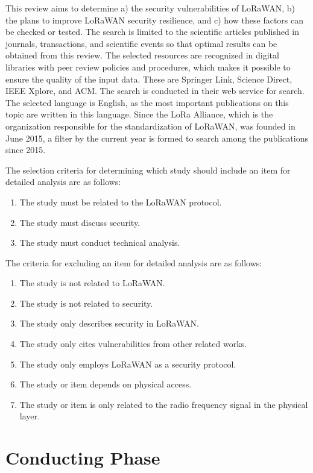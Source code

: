 \documentclass[manuscript,screen,review=false]{acmart}
\begin{document}
This review aims to determine a) the security vulnerabilities of LoRaWAN, b) the plans to improve LoRaWAN security resilience, and c) how these factors can be checked or tested. The search is limited to the scientific articles published in journals, transactions, and scientific events so that optimal results can be obtained from this review. The selected resources are recognized in digital libraries with peer review policies and procedures, which makes it possible to ensure the quality of the input data. These are Springer Link, Science Direct, IEEE Xplore, and ACM. The search is conducted in their web service for search. The selected language is English, as the most important publications on this topic are written in this language. Since the LoRa Alliance, which is the organization responsible for the standardization of LoRaWAN, was founded in June 2015, a filter by the current year is formed to search among the publications since 2015.

The selection criteria for determining which study should include an item for detailed analysis are as follows: 
\begin{enumerate}
  \item The study must be related to the LoRaWAN protocol.
  \item The study must discuss security.
  \item The study must conduct technical analysis.
\end{enumerate}
   
The criteria for excluding an item for detailed analysis are as follows:
\begin{enumerate}
  \item The study is not related to LoRaWAN.
  \item The study is not related to security.
  \item The study only describes security in LoRaWAN.
  \item The study only cites vulnerabilities from other related works.
  \item The study only employs LoRaWAN as a security protocol.
  \item The study or item depends on physical access.
  \item The study or item is only related to the radio frequency signal in the physical layer.
\end{enumerate}

\section{Conducting Phase}
\end{document}
